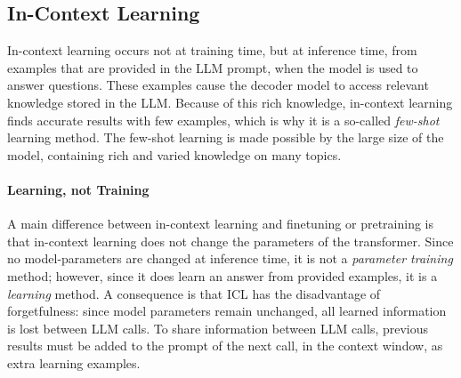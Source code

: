 \subsection{In-Context Learning}
In-context learning \citep{dong2022survey} occurs not at training time, but at inference time, from examples that are provided in the LLM prompt, when the model is used to answer questions. 
These examples cause the decoder model to access relevant knowledge stored in the LLM. Because of this rich knowledge, in-context learning finds accurate results with few examples, which is why it is a so-called {\em few-shot} learning method. %
The few-shot learning is made possible by the large size of the model, containing  rich and varied knowledge on many topics.

\paragraph{Learning, not Training}
A main difference between in-context learning and finetuning or pretraining is that in-context learning does not change the  parameters of the transformer.
Since no model-parameters are changed at inference time, it is not a {\em parameter training} method; however, since it does learn an answer from provided examples, it is a {\em learning} method. 
%
%
A consequence is that ICL has the disadvantage of forgetfulness: since model parameters remain unchanged, all learned information is lost between LLM calls. To share information between LLM calls, previous results must be added to the prompt of the next call, in the context window, as extra learning examples. 

